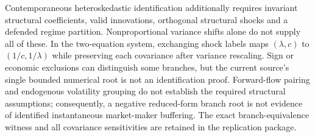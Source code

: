 \documentclass[12pt]{article}
\theoremstyle{definition}
\theoremstyle{remark}
\begin{document}
Contemporaneous heteroskedastic identification additionally requires invariant structural coefficients, valid innovations, orthogonal structural shocks and a defended regime partition. Nonproportional variance shifts alone do not supply all of these. In the two-equation system, exchanging shock labels maps $(\lambda,c)$ to $(1/c,1/\lambda)$ while preserving each covariance after variance rescaling. Sign or economic exclusions can distinguish some branches, but the current source's single bounded numerical root is not an identification proof. Forward-flow pairing and endogenous volatility grouping do not establish the required structural assumptions; consequently, a negative reduced-form branch root is not evidence of identified instantaneous market-maker buffering. The exact branch-equivalence witness and all covariance sensitivities are retained in the replication package.
\end{document}
